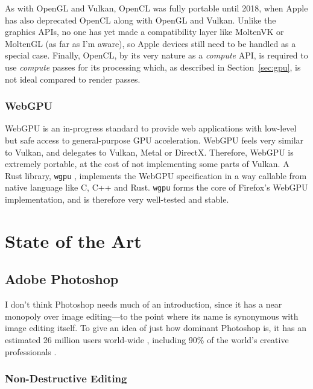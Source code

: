 \documentclass[12pt]{article}
\begin{document}
As with OpenGL and Vulkan, OpenCL was fully portable until 2018, when Apple has also deprecated
OpenCL along with OpenGL and Vulkan.  Unlike the graphics APIs, no one has yet made a compatibility
layer like MoltenVK or MoltenGL (as far as I'm aware), so Apple devices still need to be handled as
a special case.  Finally, OpenCL, by its very nature as a \emph{compute} API, is required to use
\emph{compute} passes for its processing which, as described in Section~\ref{sec:gpu}, is not ideal
compared to render passes.

\subsubsection{WebGPU}\label{sec:wgpu}

WebGPU \cite{webgpu} is an in-progress standard to provide web
applications with low-level but safe access to general-purpose GPU acceleration.  WebGPU feels very
similar to Vulkan, and delegates to Vulkan, Metal or DirectX.  Therefore, WebGPU is extremely
portable, at the cost of not implementing some parts of Vulkan.  A Rust library,
\verb|wgpu| \cite{wgpu}, implements the WebGPU specification in a way
callable from native language like C, C++ and Rust.  \verb|wgpu| forms the core of Firefox's WebGPU
implementation, and is therefore very well-tested and stable.



\pagebreak

\section{State of the Art}\label{sec:existing-editors}

\subsection{Adobe Photoshop}

I don't think Photoshop needs much of an introduction, since it has a near monopoly over image
editing---to the point where its name is synonymous with image editing itself.  To give an idea of
just how dominant Photoshop is, it has an estimated 26 million users
world-wide \cite{photoshop-users}, including
90\% of the world's creative
professionals \cite{adobe-facts}.

\subsubsection{Non-Destructive Editing}
\end{document}
